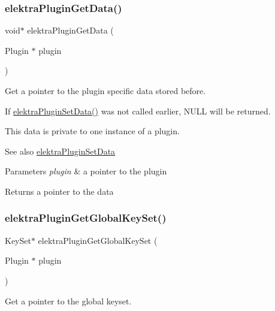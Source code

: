 \subsubsection{\texorpdfstring{elektra\+Plugin\+Get\+Data()}{elektraPluginGetData()}}
{\footnotesize\ttfamily void$\ast$ elektra\+Plugin\+Get\+Data (\begin{DoxyParamCaption}\item[{Plugin $\ast$}]{plugin }\end{DoxyParamCaption})}



Get a pointer to the plugin specific data stored before. 

If \hyperlink{group__plugin_gaf4b941a52ff55d0ca2a9158d90208ef2}{elektra\+Plugin\+Set\+Data()} was not called earlier, N\+U\+LL will be returned.

This data is private to one instance of a plugin.

\begin{DoxySeeAlso}{See also}
\hyperlink{group__plugin_gaf4b941a52ff55d0ca2a9158d90208ef2}{elektra\+Plugin\+Set\+Data} 
\end{DoxySeeAlso}

\begin{DoxyParams}{Parameters}
{\em plugin} & a pointer to the plugin \\
\hline
\end{DoxyParams}
\begin{DoxyReturn}{Returns}
a pointer to the data 
\end{DoxyReturn}
\mbox{\label{group__plugin_ga436cda13ed70c0face08661a90620bf6}} 
\subsubsection{\texorpdfstring{elektra\+Plugin\+Get\+Global\+Key\+Set()}{elektraPluginGetGlobalKeySet()}}
{\footnotesize\ttfamily Key\+Set$\ast$ elektra\+Plugin\+Get\+Global\+Key\+Set (\begin{DoxyParamCaption}\item[{Plugin $\ast$}]{plugin }\end{DoxyParamCaption})}



Get a pointer to the global keyset. 

